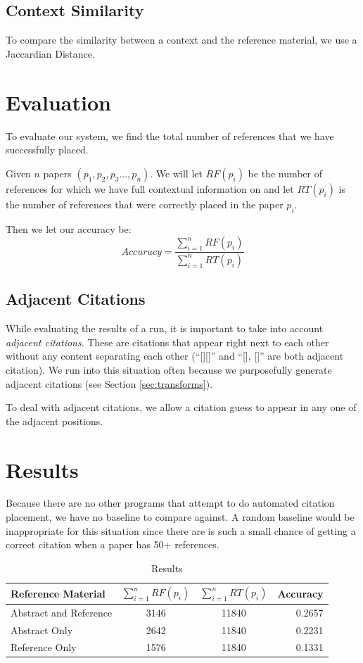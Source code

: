 \documentclass[10pt, conference, compsocconf]{IEEEtran}
\begin{document}
\subsection{Context Similarity}
To compare the similarity between a context and the reference material, we use a Jaccardian Distance\cite{jaccard}.

\section{Evaluation}\label{sec:eval}
To evaluate our system, we find the total number of references that we have successfully placed.

Given $n$ papers $(p_{1}, p_{2}, p_{3} ..., p_{n})$. We will let $RF(p_{i})$ be the number of references
for which we have full contextual information on and let $RT(p_{i})$ is the number of references
that were correctly placed in the paper $p_{i}$.

Then we let our accuracy be:
$$Accuracy = \frac{\sum_{i = 1}^{n} RF(p_{i})}{\sum_{i = 1}^{n} RT(p_{i})}$$

\subsection{Adjacent Citations}
While evaluating the results of a run, it is important to take into account \textit{adjacent citations}.
These are citations that appear right next to each other without any content separating each other (``[][]'' and ``[], []''
are both adjacent citation). We run into this situation often because we purposefully generate adjacent citations (see
Section \ref{sec:transforms}).

To deal with adjacent citations, we allow a citation guess to appear in any one of the adjacent positions.

\section{Results}\label{sec:results}
Because there are no other programs that attempt to do automated citation placement, we have no baseline to compare against.
A random baseline would be inappropriate for this situation since there are is such a small chance of getting a correct
citation when a paper has 50+ references.

\begin{table}[H]
\centering
\begin{tabular} { l | c | c | r }
\hline\hline
        {\bf Reference Material} & {\bf $\sum_{i = 1}^{n} RF(p_{i})$} & {\bf $\sum_{i = 1}^{n} RT(p_{i})$} & {\bf Accuracy} \\[0.5ex]
\hline
        Abstract and Reference & 3146 & 11840 & 0.2657 \\[0.5ex]
\hline
        Abstract Only & 2642 & 11840 & 0.2231 \\[0.5ex]
\hline
        Reference Only & 1576 & 11840 & 0.1331 \\[0.5ex]
\end{tabular}
\caption{Results}
\label{tab:results}
\end{table}
\end{document}
